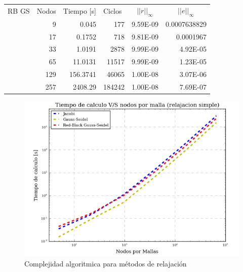\documentclass[letter,10pt]{article}
\begin{document}
\begin{table}[H]
\begin{tabular}[t]{|l|r|r|r|r|r|}
\multicolumn{ 1}{|c|}{RB GS} & \multicolumn{1}{l|}{Nodos} & \multicolumn{1}{l|}{Tiempo [s]}& \multicolumn{1}{l|}{Ciclos} & \multicolumn{1}{c|}{$||r||_{\infty}$} & \multicolumn{1}{c|}{$||e||_{\infty}$} \\ \cline{ 2- 6}
\multicolumn{ 1}{|l|}{} &9 & 0.045& 177 & 9.59E-09 & 0.0007638829 \\ \cline{ 2- 6}
\multicolumn{ 1}{|l|}{} & 17 & 0.1752 & 718 &9.81E-09 & 0.0001967 \\ \cline{ 2- 6}
\multicolumn{ 1}{|l|}{} & 33 & 1.0191 & 2878 &9.99E-09 & 4.92E-05 \\ \cline{ 2- 6}
\multicolumn{ 1}{|l|}{} & 65 & 11.0131 &11517 &9.99E-09 & 1.23E-05 \\ \cline{ 2- 6}
\multicolumn{ 1}{|l|}{} & 129 & 156.3741 &46065 &1.00E-08 & 3.07E-06 \\ \cline{ 2- 6}
\multicolumn{ 1}{|l|}{} & 257 & 2408.29 &184242 &1.00E-08  & 7.69E-07 \\ \hline
\end{tabular}
\label{resumenrelaximple}
\end{table}

\begin{figure}
\centering
\includegraphics[scale=0.8]{img/tvsnsimple}
\caption{Complejidad algoritmica para métodos de relajación}
\label{comtvsnsimple}
\end{figure}
\end{document}
